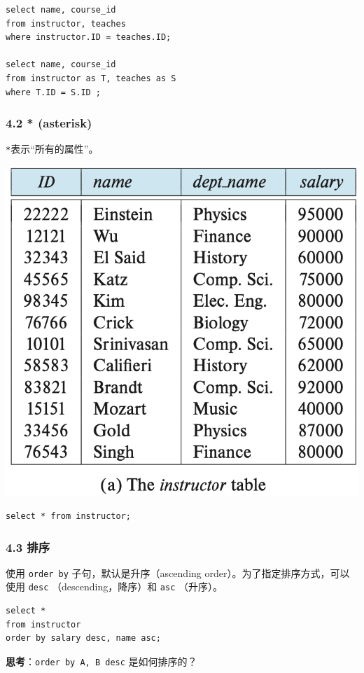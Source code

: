 \documentclass[aspectratio=169, 14pt]{beamer}
\begin{document}
\begin{frame}[fragile]

    \begin{verbatim} 
select name, course_id
from instructor, teaches
where instructor.ID = teaches.ID;   

select name, course_id
from instructor as T, teaches as S
where T.ID = S.ID ;
    \end{verbatim} 

\end{frame}

\begin{frame}[fragile]
    \frametitle{4.2 * (asterisk)}
\texttt{*}表示“所有的属性”。    

\includegraphics[width=.6\textwidth,trim={0cm 8.5cm 0cm 0cm},clip]{table/instructor}

\begin{verbatim} 
select * from instructor;
\end{verbatim} 


\end{frame}

\begin{frame}[fragile]
    \frametitle{4.3 排序}
    使用 \texttt{order by} 子句，默认是升序（ascending order）。为了指定排序方式，可以使用 \texttt{desc} （descending，降序）和 \texttt{asc} （升序）。

    \begin{verbatim} 
select *
from instructor
order by salary desc, name asc;        
    \end{verbatim}     

 \textbf{思考}：\alert{\texttt{order by A, B desc}} 是如何排序的？
\end{frame}
\end{document}
